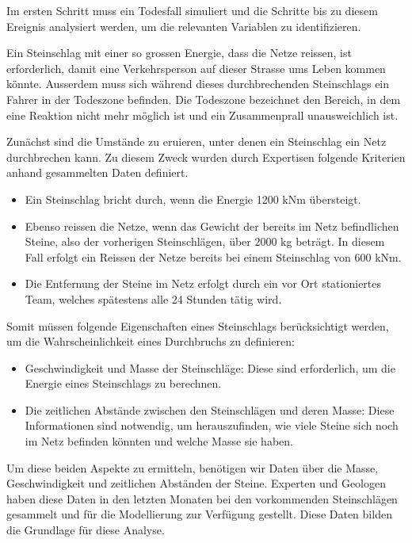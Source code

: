 \documentclass[
  letterpaper,
  DIV=11,
  numbers=noendperiod]{scrartcl}
\providecommand{\tightlist}{%
  \setlength{\itemsep}{0pt}\setlength{\parskip}{0pt}}\usepackage{longtable,booktabs,array}
\begin{document}
Im ersten Schritt muss ein Todesfall simuliert und die Schritte bis zu
diesem Ereignis analysiert werden, um die relevanten Variablen zu
identifizieren.

Ein Steinschlag mit einer so grossen Energie, dass die Netze reissen,
ist erforderlich, damit eine Verkehrsperson auf dieser Strasse ums Leben
kommen könnte. Ausserdem muss sich während dieses durchbrechenden
Steinschlags ein Fahrer in der Todeszone befinden. Die Todeszone
bezeichnet den Bereich, in dem eine Reaktion nicht mehr möglich ist und
ein Zusammenprall unausweichlich ist.

Zunächst sind die Umstände zu eruieren, unter denen ein Steinschlag ein
Netz durchbrechen kann. Zu diesem Zweck wurden durch Expertisen folgende
Kriterien anhand gesammelten Daten definiert.

\begin{itemize}
\tightlist
\item
  Ein Steinschlag bricht durch, wenn die Energie 1200 kNm übersteigt.
\item
  Ebenso reissen die Netze, wenn das Gewicht der bereits im Netz
  befindlichen Steine, also der vorherigen Steinschlägen, über 2000 kg
  beträgt. In diesem Fall erfolgt ein Reissen der Netze bereits bei
  einem Steinschlag von 600 kNm.
\item
  Die Entfernung der Steine im Netz erfolgt durch ein vor Ort
  stationiertes Team, welches spätestens alle 24 Stunden tätig wird.
\end{itemize}

Somit müssen folgende Eigenschaften eines Steinschlags berücksichtigt
werden, um die Wahrscheinlichkeit eines Durchbruchs zu definieren:

\begin{itemize}
\item
  Geschwindigkeit und Masse der Steinschläge: Diese sind erforderlich,
  um die Energie eines Steinschlags zu berechnen.
\item
  Die zeitlichen Abstände zwischen den Steinschlägen und deren Masse:
  Diese Informationen sind notwendig, um herauszufinden, wie viele
  Steine sich noch im Netz befinden könnten und welche Masse sie haben.
\end{itemize}

Um diese beiden Aspekte zu ermitteln, benötigen wir Daten über die
Masse, Geschwindigkeit und zeitlichen Abständen der Steine. Experten und
Geologen haben diese Daten in den letzten Monaten bei den vorkommenden
Steinschlägen gesammelt und für die Modellierung zur Verfügung gestellt.
Diese Daten bilden die Grundlage für diese Analyse.
\end{document}
